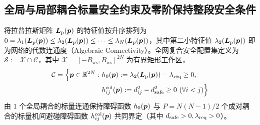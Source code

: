 \subsection{全局与局部耦合标量安全约束及零阶保持整段安全条件}
将拉普拉斯矩阵 $\boldsymbol{L}_{\mathrm{p}}(\boldsymbol{p})$ 的特征值按升序排列为 $0=\lambda_1(\boldsymbol{L}_{\mathrm{p}}(\boldsymbol{p}))\le\lambda_2(\boldsymbol{L}_{\mathrm{p}}(\boldsymbol{p}))\le\cdots\le\lambda_N(\boldsymbol{L}_{\mathrm{p}}(\boldsymbol{p}))$，其中第二小特征值 $\lambda_2(\boldsymbol{L}_{\mathrm{p}}(\boldsymbol{p}))$ 即为网络的代数连通度（Algebraic Connectivity）。全网复合安全配置集定义为 $\mathcal S:=\mathcal X\cap\mathcal C$，其中 $\mathcal X=[-B_{\mathrm{ws}},B_{\mathrm{ws}}]^{2N}$ 为有界矩形工作区，
\begin{equation}
\begin{split}
 \mathcal C=\Big\{\bp\in\mathbb R^{2N}:\ &h_0(\bp):=\lambda_2(\bL(\bp))-\lr\ge 0,\\
 &h_{ij}^{\mathrm{col}}(\bp):=d_{ij}^2-\ds^2\ge 0\ (\forall i<j)\Big\}
\end{split}
 \label{eq:safe-set}
\end{equation}
由 $1$ 个全局耦合的标量连通保持障碍函数 $h_0(\boldsymbol{p})$ 与 $P=N(N-1)/2$ 个成对耦合的标量机间避碰障碍函数 $h_{ij}^{\mathrm{col}}(\boldsymbol{p})$ 共同界定（其中 $d_{\mathrm{safe}}>0,\lambda_{\mathrm{req}}>0$）。

